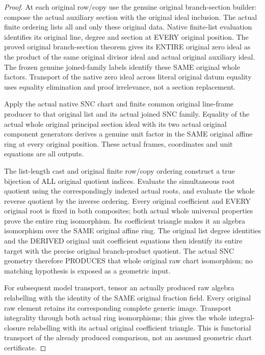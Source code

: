 \begin{proof}
At each original row/copy use the genuine original branch-section builder:
compose the actual auxiliary section with the original ideal inclusion.
The actual finite ordering lists all and only these original data. Native
finite-list evaluation identifies its original line, degree and section at
EVERY original position. The proved original branch-section theorem gives
its ENTIRE original zero ideal as the product of the same original divisor
ideal and actual original auxiliary ideal. The frozen genuine joined-family
labels identify these SAME original whole factors. Transport of the native
zero ideal across literal original datum equality uses equality elimination
and proof irrelevance, not a section replacement.

Apply the actual native SNC chart and finite common original line-frame
producer to that original list and its actual joined SNC family. Equality of
the actual whole original principal section ideal with its two actual original
component generators derives a genuine unit factor in the SAME original
affine ring at every original position. These actual frames, coordinates and
unit equations are all outputs.

The list-length cast and original finite row/copy ordering construct a true
bijection of ALL original quotient indices. Evaluate the simultaneous root
quotient using the correspondingly indexed actual roots, and evaluate the
whole reverse quotient by the inverse ordering. Every original coefficient
and EVERY original root is fixed in both composites; both actual whole
universal properties prove the entire ring isomorphism. Its coefficient
triangle makes it an algebra isomorphism over the SAME original affine ring.
The original list degree identities and the DERIVED original unit coefficient
equations then identify its entire target with the precise original
branch-product quotient. The actual SNC geometry therefore PRODUCES that
whole original raw chart isomorphism; no matching hypothesis is exposed as a
geometric input.

For subsequent model transport, tensor an actually produced raw algebra
relabelling with the identity of the SAME original fraction field. Every
original raw element retains its corresponding complete generic image.
Transport integrality through both actual ring isomorphisms; this gives the
whole integral-closure relabelling with its actual original coefficient
triangle. This is functorial transport of the already produced comparison,
not an assumed geometric chart certificate.
\end{proof}

